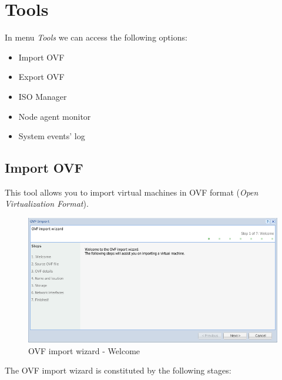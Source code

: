 \section{Tools}

In menu \emph{Tools} we can access the following options:
\begin{itemize}
\item Import OVF
\item Export OVF
\item ISO Manager
\item Node agent monitor
\item System events' log
\end{itemize}

\subsection{Import OVF}
This tool allows you to import virtual machines in OVF format (\emph{Open Virtualization Format}).

\begin{figure}[H]
	\begin{center}
	\includegraphics[scale=0.5]{screenshots/ovf_import.png}
	\caption{OVF import wizard - Welcome}
	\label{fig:ovf_import_wiz}
	\end{center}
\end{figure}
The OVF import wizard is constituted by the following stages:

